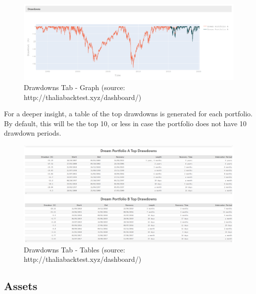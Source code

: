 \documentclass[main.tex]{subfiles}
\begin{document}
\begin{figure}[H]

   \centering

   \includegraphics[width=\textwidth]{08Appendices/081User/081Pictures/drawdowns_graph.png}

   \caption{Drawdowns Tab - Graph (source: http://thaliabacktest.xyz/dashboard/)}

   \label{drawdowns_graph}

\end{figure}



For a deeper insight, a table of the top drawdowns is generated for each portfolio. By default, this will be the top 10, or less in case the portfolio does not have 10 drawdown periods. 



\begin{figure}[H]

   \centering

   \includegraphics[width=\textwidth]{08Appendices/081User/081Pictures/drawdowns_tables.png}

   \caption{Drawdowns Tab - Tables (source: http://thaliabacktest.xyz/dashboard/)}

   \label{drawdowns_table}

\end{figure}



\subsection*{Assets}
\end{document}
